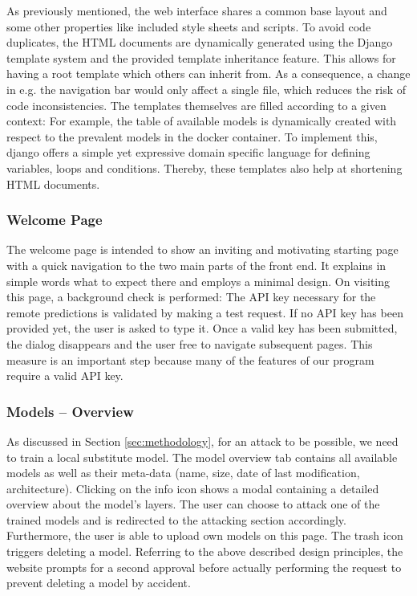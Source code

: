 As previously mentioned, the web interface shares a common base layout and some other properties like included style sheets and scripts.
To avoid code duplicates, the HTML documents are dynamically generated using the Django template system and the provided template inheritance feature.
This allows for having a root template which others can inherit from.
As a consequence, a change in e.g. the navigation bar would only affect a single file, which reduces the risk of code inconsistencies.
The templates themselves are filled according to a given context: For example, the table of available models is dynamically created with respect to the prevalent models in the docker container.
To implement this, django offers a simple yet expressive domain specific language for defining variables, loops and conditions.
Thereby, these templates also help at shortening HTML documents.

\subsubsection{Welcome Page}
The welcome page is intended to show an inviting and motivating starting page with a quick navigation to the two main parts of the front end.
It explains in simple words what to expect there and employs a minimal design.
On visiting this page, a background check is performed: The API key necessary for the remote predictions is validated by making a test request.
If no API key has been provided yet, the user is asked to type it.
Once a valid key has been submitted, the dialog disappears and the user free to navigate subsequent pages.
This measure is an important step because many of the features of our program require a valid API key.

\subsubsection{Models -- Overview}
As discussed in Section \ref{sec:methodology}, for an attack to be possible, we need to train a local substitute model.
The model overview tab contains all available models as well as their meta-data (name, size, date of last modification, architecture).
Clicking on the info icon shows a modal containing a detailed overview about the model's layers.
The user can choose to attack one of the trained models and is redirected to the attacking section accordingly. 
Furthermore, the user is able to upload own models on this page.
The trash icon triggers deleting a model.
Referring to the above described design principles, the website prompts for a second approval before actually performing the request to prevent deleting a model by accident.

